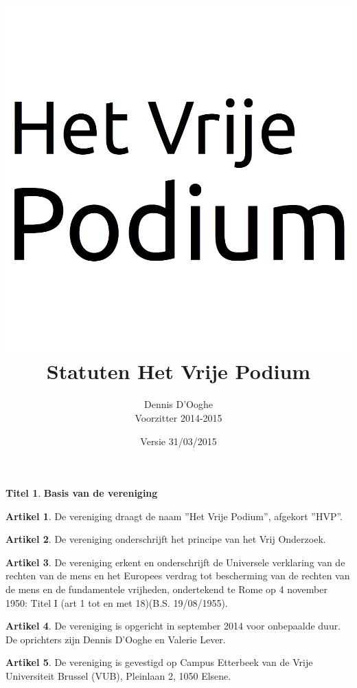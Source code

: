 \documentclass[a4paper,10pt]{article}
\title{\vspace{-2.0cm}\includegraphics[scale=0.3]{img/logo.png}\\
  \vspace{1cm}Statuten Het Vrije Podium}
\author{Dennis D'Ooghe\\Voorzitter 2014-2015}
\date{Versie 31/03/2015} %
\theoremstyle{definition}
\newtheorem{titel}{\newline\Large Titel}
\newtheorem{artikel}{\large Artikel}
\newcommand{\ttext}[1]{\Large \textbf{#1} \normalsize}
\newcommand{\ttextcr}{\hfill\newline}
\begin{document}
\maketitle

\begin{versionhistory}
\end{versionhistory}

\newpage


\begin{titel}\ttext{Basis van de vereniging}

  \begin{artikel}\ttextcr
    De vereniging draagt de naam ''Het Vrije Podium'', afgekort ''HVP''.
  \end{artikel}

  \begin{artikel}\ttextcr
    De vereniging onderschrijft het principe van het Vrij Onderzoek.
  \end{artikel}

  \begin{artikel}\ttextcr
    De vereniging erkent en onderschrijft de Universele verklaring van de rechten van de mens en het Europees verdrag tot bescherming van de rechten van de mens en de fundamentele vrijheden, ondertekend te Rome op 4 november 1950: Titel I (art 1 tot en met 18)(B.S. 19/08/1955).
  \end{artikel}

  \begin{artikel}\label{kring-oprichting}\ttextcr
    De vereniging is opgericht in september 2014 voor onbepaalde duur.
    De oprichters zijn Dennis D'Ooghe en Valerie Lever.
  \end{artikel}

  \begin{artikel}\ttextcr
    De vereniging is gevestigd op Campus Etterbeek van de Vrije Universiteit Brussel (VUB), Pleinlaan 2, 1050 Elsene.
  \end{artikel}


\end{titel}
\end{document}
